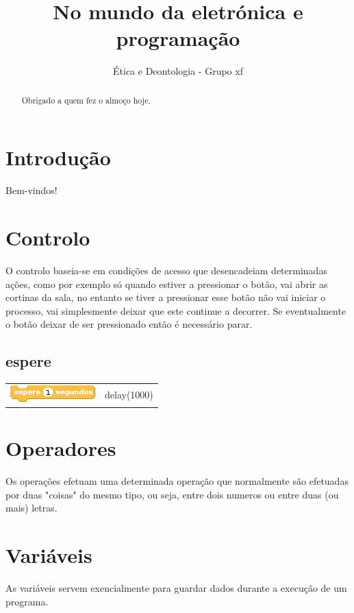 \documentclass{article}
\begin{document}
\title{No mundo da eletrónica e programação}
\author{Ética e Deontologia - Grupo xf}

\maketitle

\begin{abstract}
Obrigado a quem fez o almoço hoje.
\end{abstract}

\section{Introdução}
Bem-vindos!

\section{Controlo}
O controlo baseia-se em condições de acesso que desencadeiam determinadas ações, como por exemplo só quando estiver a pressionar o botão, vai abrir as cortinas da sala, no entanto se tiver a pressionar esse botão não vai iniciar o processo, vai simplesmente deixar que este continue a decorrer. Se eventualmente o botão deixar de ser pressionado então é necessário parar.

\subsection{espere}
\begin{tabular}{ c c }
    \includegraphics{imgs/controlers/espere} & delay(1000) \\
\end{tabular}

\section{Operadores}
Os operações efetuam uma determinada operação que normalmente são efetuadas por duas "coisas" do mesmo tipo, ou seja, entre dois numeros ou entre duas (ou mais) letras.

\section{Variáveis}
As variáveis servem exencialmente para guardar dados durante a execução de um programa.
\end{document}
